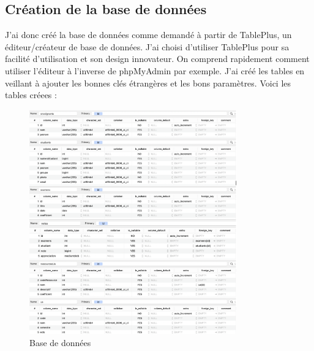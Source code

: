 \documentclass[12pt, a4paper]{article}
\begin{document}
        \subsection{Création de la base de données}
        J’ai donc créé la base de données comme demandé à partir de TablePlus, un éditeur/créateur de base de données. J’ai choisi d’utiliser TablePlus pour sa facilité d’utilisation et son design innovateur. On comprend rapidement comment utiliser l’éditeur à l’inverse de phpMyAdmin par exemple. 
        J’ai créé les tables en veillant à ajouter les bonnes clés étrangères et les bons paramètres. Voici les tables créees : \\[0.5cm]
        \begin{figure}[h]
            \centering
            \includegraphics[width=0.8\textwidth]{img1.png}
            \caption{Base de données}
            \label{fig:basededonnees}
        \end{figure}
        \newpage
\end{document}
